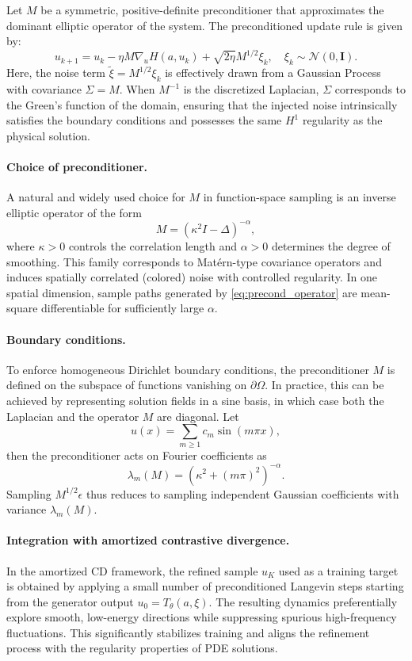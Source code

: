 \documentclass[11pt]{article}
\begin{document}
Let $M$ be a symmetric, positive-definite preconditioner that approximates the dominant elliptic operator of the system. The preconditioned update rule is given by:
\begin{equation}
    u_{k+1} = u_{k} - \eta M \nabla_u H(a, u_k) + \sqrt{2\eta} M^{1/2} \xi_k, \quad \xi_k \sim \mathcal{N}(0, \mathbf{I}).
\end{equation}
Here, the noise term $\tilde{\xi} = M^{1/2} \xi_k$ is effectively drawn from a Gaussian Process with covariance $\Sigma = M$. When $M^{-1}$ is the discretized Laplacian, $\Sigma$ corresponds to the Green's function of the domain, ensuring that the injected noise intrinsically satisfies the boundary conditions and possesses the same $H^1$ regularity as the physical solution.

\paragraph{Choice of preconditioner.}
A natural and widely used choice for \(M\) in function-space sampling is an inverse elliptic operator of the form
\begin{equation}
    \label{eq:precond_operator}
    M = (\kappa^2 I - \Delta)^{-\alpha},
\end{equation}
where \(\kappa > 0\) controls the correlation length and \(\alpha > 0\) determines the degree of smoothing. This family corresponds to Matérn-type covariance operators and induces spatially correlated (colored) noise with controlled regularity. In one spatial dimension, sample paths generated by \eqref{eq:precond_operator} are mean-square differentiable for sufficiently large \(\alpha\).

\paragraph{Boundary conditions.}
To enforce homogeneous Dirichlet boundary conditions, the preconditioner \(M\) is defined on the subspace of functions vanishing on \(\partial\Omega\). In practice, this can be achieved by representing solution fields in a sine basis, in which case both the Laplacian and the operator \(M\) are diagonal. Let
\[
u(x) = \sum_{m \ge 1} c_m \sin(m \pi x),
\]
then the preconditioner acts on Fourier coefficients as
\[
\lambda_m(M) = (\kappa^2 + (m\pi)^2)^{-\alpha}.
\]
Sampling \(M^{1/2}\epsilon\) thus reduces to sampling independent Gaussian coefficients with variance \(\lambda_m(M)\).


\paragraph{Integration with amortized contrastive divergence.}
In the amortized CD framework, the refined sample \(u_K\) used as a training target is obtained by applying a small number of preconditioned Langevin steps starting from the generator output \(u_0 = T_\theta(a,\xi)\). The resulting dynamics preferentially explore smooth, low-energy directions while suppressing spurious high-frequency fluctuations. This significantly stabilizes training and aligns the refinement process with the regularity properties of PDE solutions.
\end{document}
